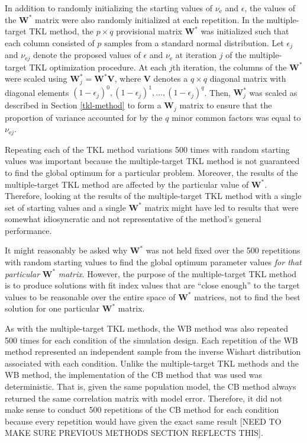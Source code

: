 \documentclass[11pt]{umnthesis}
\begin{document}
In addition to randomly initializing the starting values of \(\nu_{\textrm{e}}\) and \(\epsilon\), the values of the \(\mathbf{W}^*\) matrix were also randomly initialized at each repetition. In the multiple-target TKL method, the \(p \times q\) provisional matrix \(\mathbf{W}^*\) was initialized such that each column consisted of \(p\) samples from a standard normal distribution. Let \(\epsilon_j\) and \(\nu_{\textrm{e}j}\) denote the proposed values of \(\epsilon\) and \(\nu_{\textrm{e}}\) at iteration \(j\) of the multiple-target TKL optimization procedure. At each \(j\)th iteration, the columns of the \(\mathbf{W}^*\) were scaled using \(\mathbf{W}^*_j = \mathbf{W}^* \mathbf{V}\), where \(\mathbf{V}\) denotes a \(q \times q\) diagonal matrix with diagonal elements \((1-\epsilon_j)^0, (1-\epsilon_j)^1, \dots, (1-\epsilon_j)^q\). Then, \(\mathbf{W}^*_j\) was scaled as described in Section \ref{tkl-method} to form a \(\mathbf{W}_j\) matrix to ensure that the proportion of variance accounted for by the \(q\) minor common factors was equal to \(\nu_{\mathrm{e}j}\).

Repeating each of the TKL method variations 500 times with random starting values was important because the multiple-target TKL method is not guaranteed to find the global optimum for a particular problem. Moreover, the results of the multiple-target TKL method are affected by the particular value of \(\mathbf{W}^*\). Therefore, looking at the results of the multiple-target TKL method with a single set of starting values and a single \(\mathbf{W}^*\) matrix might have led to results that were somewhat idiosyncratic and not representative of the method's general performance.

It might reasonably be asked why \(\mathbf{W}^*\) was not held fixed over the 500 repetitions with random starting values to find the global optimum parameter values \emph{for that particular} \(\mathbf{W}^*\) \emph{matrix}. However, the purpose of the multiple-target TKL method is to produce solutions with fit index values that are ``close enough'' to the target values to be reasonable over the entire space of \(\mathbf{W}^*\) matrices, not to find the best solution for one particular \(\mathbf{W}^*\) matrix.

As with the multiple-target TKL methods, the WB method was also repeated 500 times for each condition of the simulation design. Each repetition of the WB method represented an independent sample from the inverse Wishart distribution associated with each condition. Unlike the multiple-target TKL methods and the WB method, the implementation of the CB method that was used was deterministic. That is, given the same population model, the CB method always returned the same correlation matrix with model error. Therefore, it did not make sense to conduct 500 repetitions of the CB method for each condition because every repetition would have given the exact same result {[}NEED TO MAKE SURE PREVIOUS METHODS SECTION REFLECTS THIS{]}.
\end{document}
